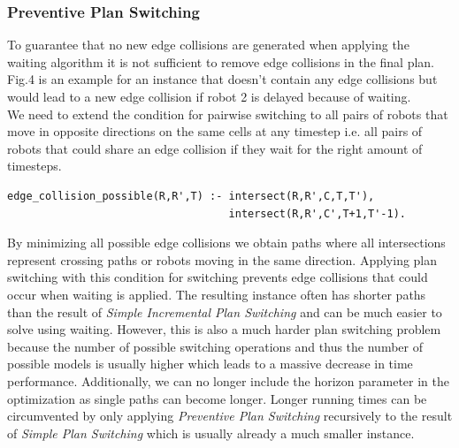 \documentclass{llncs}
\begin{document}
\subsubsection{Preventive Plan Switching}
To guarantee that no new edge collisions are generated when applying the waiting algorithm it is not sufficient to remove edge collisions in the final plan. Fig.4 is an example for an instance that doesn't contain any edge collisions but would lead to a new edge collision if robot 2 is delayed because of waiting. \\
We need to extend the condition for pairwise switching to all pairs of robots that move in opposite directions on the same cells at any timestep i.e. all pairs of robots that could share an edge collision if they wait for the right amount of timesteps.
\begin{verbatim}
edge_collision_possible(R,R',T) :- intersect(R,R',C,T,T'), 
                                   intersect(R,R',C',T+1,T'-1).
\end{verbatim}
By minimizing all possible edge collisions we obtain paths where all intersections represent crossing paths or robots moving in the same direction. Applying plan switching with this condition for switching prevents edge collisions that could occur when waiting is applied.
The resulting instance often has shorter paths than the result of \emph{Simple Incremental Plan Switching} and can be much easier to solve using waiting.
However, this is also a much harder plan switching problem because the number of possible switching operations and thus the number of possible models is usually higher which leads to a massive decrease in time performance. Additionally, we can no longer include the horizon parameter in the optimization as single paths can become longer. Longer running times can be circumvented by only applying \emph{Preventive Plan Switching} recursively to the result of \emph{Simple Plan Switching} which is usually already a much smaller instance.
\end{document}
